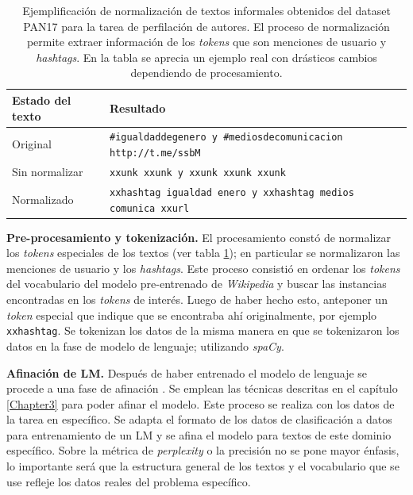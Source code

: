 \begin{table}
\centering
{}
\begin{tabular}{| p{3cm} | p{9.5cm} |}
\hline
\textbf{Estado del texto} & \textbf{Resultado} \\
\hline
Original & \texttt{\#igualdaddegenero y \#mediosdecomunicacion http://t.me/ssbM} \\
Sin normalizar & \texttt{xxunk xxunk y xxunk xxunk xxunk} \\
Normalizado & \texttt{xxhashtag igualdad enero y xxhashtag medios comunica xxurl} \\
\hline
\end{tabular}
\caption{Ejemplificación de normalización de textos informales obtenidos del dataset PAN17 para la tarea de perfilación de autores. El proceso de normalización permite extraer información de los \textit{tokens} que son menciones de usuario y \textit{hashtags}. En la tabla se aprecia un ejemplo real con drásticos cambios dependiendo de procesamiento.}
\label{tab:pan17preproc}
\end{table}

\textbf{Pre-procesamiento y tokenización.} El procesamiento constó de normalizar los \textit{tokens} especiales de los textos (ver tabla \ref{tab:pan17preproc}); en particular se normalizaron las menciones de usuario y los \textit{hashtags}. Este proceso consistió en ordenar los \textit{tokens} del vocabulario del modelo pre-entrenado de \textit{Wikipedia} y buscar las instancias encontradas en los \textit{tokens} de interés. Luego de haber hecho esto, anteponer un \textit{token} especial que indique que se encontraba ahí originalmente, por ejemplo \texttt{xxhashtag}. Se tokenizan los datos de la misma manera en que se tokenizaron los datos en la fase de modelo de lenguaje; utilizando \textit{spaCy}.

\textbf{Afinación de LM.} Después de haber entrenado el modelo de lenguaje se procede a una fase de afinación \parencite{howard2018}. Se emplean las técnicas descritas en el capítulo \ref{Chapter3} para poder afinar el modelo. Este proceso se realiza con los datos de la tarea en específico. Se adapta el formato de los datos de clasificación a datos para entrenamiento de un LM y se afina el modelo para textos de este dominio específico. Sobre la métrica de \textit{perplexity} o la precisión no se pone mayor énfasis, lo importante será que la estructura general de los textos y el vocabulario que se use refleje los datos reales del problema específico.

